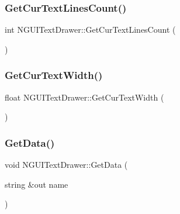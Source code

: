 \hypertarget{class_n_g_u_i_text_drawer_a36ca6165548777d898f0baea33a77bad}{}\label{class_n_g_u_i_text_drawer_a36ca6165548777d898f0baea33a77bad} 
\subsubsection{\texorpdfstring{Get\+Cur\+Text\+Lines\+Count()}{GetCurTextLinesCount()}}
{\footnotesize\ttfamily int N\+G\+U\+I\+Text\+Drawer\+::\+Get\+Cur\+Text\+Lines\+Count (\begin{DoxyParamCaption}{ }\end{DoxyParamCaption})}

\hypertarget{class_n_g_u_i_text_drawer_a3385deb122aa39bf35140b7db77c196f}{}\label{class_n_g_u_i_text_drawer_a3385deb122aa39bf35140b7db77c196f} 
\subsubsection{\texorpdfstring{Get\+Cur\+Text\+Width()}{GetCurTextWidth()}}
{\footnotesize\ttfamily float N\+G\+U\+I\+Text\+Drawer\+::\+Get\+Cur\+Text\+Width (\begin{DoxyParamCaption}{ }\end{DoxyParamCaption})}

\hypertarget{class_n_g_u_i_text_drawer_a59a384f8f0d3bb153f498d9c6581c8a0}{}\label{class_n_g_u_i_text_drawer_a59a384f8f0d3bb153f498d9c6581c8a0} 
\subsubsection{\texorpdfstring{Get\+Data()}{GetData()}}
{\footnotesize\ttfamily void N\+G\+U\+I\+Text\+Drawer\+::\+Get\+Data (\begin{DoxyParamCaption}\item[{string \&out}]{name }\end{DoxyParamCaption})}

\hypertarget{class_n_g_u_i_text_drawer_a3a9edae35e6d13b579d8919f362e7481}{}\label{class_n_g_u_i_text_drawer_a3a9edae35e6d13b579d8919f362e7481} 
